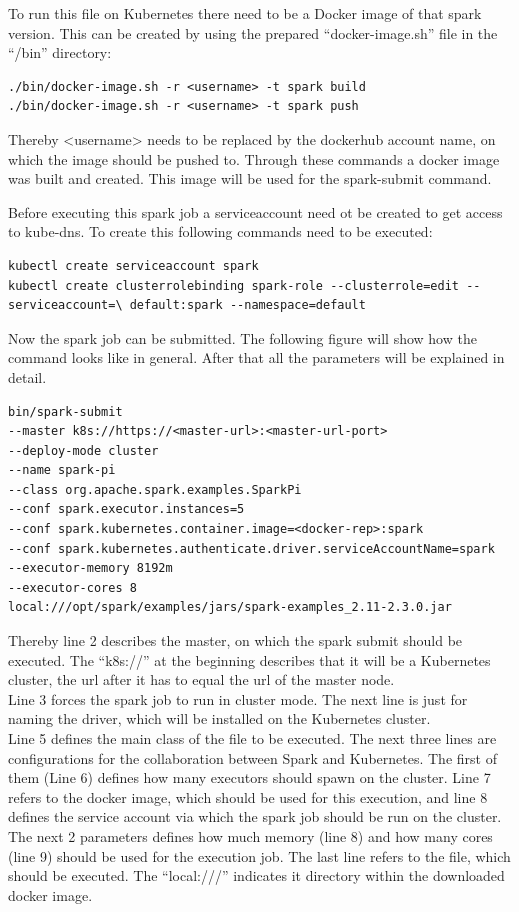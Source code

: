 To run this file on Kubernetes there need to be a Docker image of that spark version. This can be created by using the prepared ``docker-image.sh'' file in the ``/bin'' directory:
\begin{lstlisting}[caption={Create Spark 2.3.0 docker image},captionpos=b]
./bin/docker-image.sh -r <username> -t spark build
./bin/docker-image.sh -r <username> -t spark push
\end{lstlisting}
Thereby <username> needs to be replaced by the dockerhub account name, on which the image should be pushed to. Through these commands a docker image was built and created. This image will be used for the spark-submit command.

Before executing this spark job a serviceaccount need ot be created to get access to kube-dns. To create this following commands need to be executed:
\begin{lstlisting}[caption={Create spark serviceaccount for Kubernetes},captionpos=b]
kubectl create serviceaccount spark
kubectl create clusterrolebinding spark-role --clusterrole=edit --serviceaccount=\ default:spark --namespace=default
\end{lstlisting}

Now the spark job can be submitted. The following figure will show how the command looks like in general. After that all the parameters will be explained in detail.

\begin{lstlisting}[caption={Spark-submit to Kubernetes master},captionpos=b]
bin/spark-submit 
--master k8s://https://<master-url>:<master-url-port> 
--deploy-mode cluster 
--name spark-pi 
--class org.apache.spark.examples.SparkPi 
--conf spark.executor.instances=5 
--conf spark.kubernetes.container.image=<docker-rep>:spark 
--conf spark.kubernetes.authenticate.driver.serviceAccountName=spark 
--executor-memory 8192m 
--executor-cores 8 
local:///opt/spark/examples/jars/spark-examples_2.11-2.3.0.jar
\end{lstlisting}

Thereby line 2 describes the master, on which the spark submit should be executed. The ``k8s://'' at the beginning describes that it will be a Kubernetes cluster, the url after it has to equal the url of the master node.\\
Line 3 forces the spark job to run in cluster mode. The next line is just for naming the driver, which will be installed on the Kubernetes cluster.\\
Line 5 defines the main class of the file to be executed. The next three lines are configurations for the collaboration between Spark and Kubernetes. The first of them (Line 6) defines how many executors should spawn on the cluster. Line 7 refers to the docker image, which should be used for this execution, and line 8 defines the service account via which the spark job should be run on the cluster.\\
The next 2 parameters defines how much memory (line 8) and how many cores (line 9) should be used for the execution job. 
The last line refers to the file, which should be executed. The ``local:///'' indicates it directory within the downloaded docker image.


